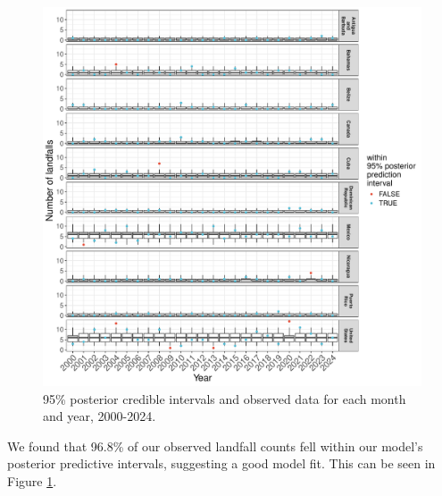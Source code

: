 \documentclass[
]{article}
\begin{document}
\begin{figure}

{\centering \includegraphics[width=1\linewidth]{../outputs/bayesian-analysis-country-freq/country-post-pred-checks} 

}

\caption{95\% posterior credible intervals and observed data for each month and year, 2000-2024.}\label{fig:figs15}
\end{figure}

We found that 96.8\% of our observed landfall counts fell within our model's posterior predictive intervals, suggesting a good model fit. This can be seen in Figure \ref{fig:figs15}.
\end{document}
